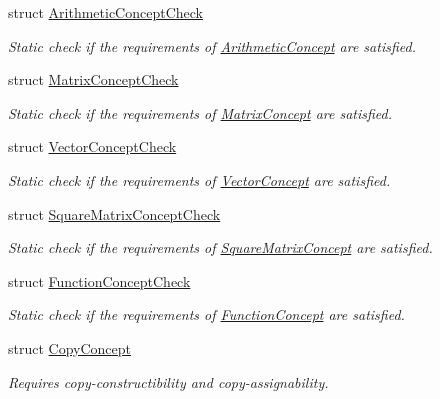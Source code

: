 \begin{DoxyCompactItemize}
struct \hyperlink{structFunG_1_1Concepts_1_1ArithmeticConceptCheck}{\-Arithmetic\-Concept\-Check}
\begin{DoxyCompactList}\small\item\em \-Static check if the requirements of \hyperlink{structFunG_1_1Concepts_1_1ArithmeticConcept}{\-Arithmetic\-Concept} are satisfied. \end{DoxyCompactList}\item 
struct \hyperlink{structFunG_1_1Concepts_1_1MatrixConceptCheck}{\-Matrix\-Concept\-Check}
\begin{DoxyCompactList}\small\item\em \-Static check if the requirements of \hyperlink{structFunG_1_1Concepts_1_1MatrixConcept}{\-Matrix\-Concept} are satisfied. \end{DoxyCompactList}\item 
struct \hyperlink{structFunG_1_1Concepts_1_1VectorConceptCheck}{\-Vector\-Concept\-Check}
\begin{DoxyCompactList}\small\item\em \-Static check if the requirements of \hyperlink{structFunG_1_1Concepts_1_1VectorConcept}{\-Vector\-Concept} are satisfied. \end{DoxyCompactList}\item 
struct \hyperlink{structFunG_1_1Concepts_1_1SquareMatrixConceptCheck}{\-Square\-Matrix\-Concept\-Check}
\begin{DoxyCompactList}\small\item\em \-Static check if the requirements of \hyperlink{structFunG_1_1Concepts_1_1SquareMatrixConcept}{\-Square\-Matrix\-Concept} are satisfied. \end{DoxyCompactList}\item 
struct \hyperlink{structFunG_1_1Concepts_1_1FunctionConceptCheck}{\-Function\-Concept\-Check}
\begin{DoxyCompactList}\small\item\em \-Static check if the requirements of \hyperlink{structFunG_1_1Concepts_1_1FunctionConcept}{\-Function\-Concept} are satisfied. \end{DoxyCompactList}\item 
struct \hyperlink{structFunG_1_1Concepts_1_1CopyConcept}{\-Copy\-Concept}
\begin{DoxyCompactList}\small\item\em \-Requires copy-\/constructibility and copy-\/assignability. \end{DoxyCompactList}\item 

\end{DoxyCompactItemize}
